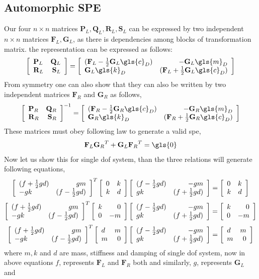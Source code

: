 \subsection{Automorphic SPE}
Our four $n\times n$ matrices $\mathbf{P}_L, \mathbf{Q}_L,\mathbf{R}_L,\mathbf{S}_L$ can be expressed by two independent $n\times n$ matrices 
$\mathbf{F}_L,\mathbf{G}_L$, as there is dependencies among blocks of 
transformation matrix. the representation can be expressed as follows:
\begin{align}
\mat{\mathbf{P}_L}{\mathbf{Q}_L}{\mathbf{R}_L}{\mathbf{S}_L} = \mat{(\mathbf{F}_L - \frac{1}{2}\mathbf{G}_L \gls{c}_D)}{-\mathbf{G}_L \gls{m}_D}{\mathbf{G}_L \gls{k}_D}{(\mathbf{F}_L + \frac{1}{2}\mathbf{G}_L \gls{c}_D)}
\end{align}
From symmetry one can also show that they can also be written by two 
independent matrices $\mathbf{F}_R$ and $\mathbf{G}_R$ as follows,
\begin{align}
{\mat{\mathbf{P}_R}{\mathbf{Q}_R}{\mathbf{R}_R}{\mathbf{S}_R}}^{-1} = \mat{(\mathbf{F}_R - \frac{1}{2}\mathbf{G}_R \gls{c}_D)}{-\mathbf{G}_R \gls{m}_D}{\mathbf{G}_R \gls{k}_D}{(\mathbf{F}_R + \frac{1}{2}\mathbf{G}_R \gls{c}_D)}
\end{align}
These matrices must obey following law to generate a valid \gls{spe},
\begin{align}\mathbf{F}_L {\mathbf{G}_R}^{T} + \mathbf{G}_L {\mathbf{F}_R}^T = \gls{0}\end{align}
Now let us show this for single \gls{dof} system, than the three relations will generate following equations,
\begin{align}{\left[ \begin{array}{lr} (f + \frac{1}{2}gd)& gm\\ -gk& (f - \frac{1}{2}gd)\end{array}\right]}^T\left[ \begin{array}{lr} 0& k\\ k& d\end{array}\right]\left[ \begin{array}{lr} (f - \frac{1}{2}gd)& -gm\\ gk& (f + \frac{1}{2}gd)\end{array}\right] =\left[ \begin{array}{lr} {0}& k\\ k& d\end{array}\right]\end{align}
\begin{align}{\left[ \begin{array}{lr} (f + \frac{1}{2}gd)& gm\\ -gk& (f - \frac{1}{2}gd)\end{array}\right]}^T\left[ \begin{array}{lr} k& {0}\\ {0}& -m\end{array}\right]\left[ \begin{array}{lr} (f - \frac{1}{2}gd)& -gm\\ gk& (f + \frac{1}{2}gd)\end{array}\right] =\left[ \begin{array}{lr} k& 0\\ {0}& -m\end{array}\right]\end{align}
\begin{align}{\left[ \begin{array}{lr} (f + \frac{1}{2}gd)& gm\\ -gk& (f - \frac{1}{2}gd)\end{array}\right]}^T\left[ \begin{array}{lr} d& m\\ m& {0}\end{array}\right]\left[ \begin{array}{lr} (f - \frac{1}{2}gd)& -gm\\ gk& (f + \frac{1}{2}gd)\end{array}\right] =\left[ \begin{array}{lr} d& m\\ m& 0\end{array}\right]\end{align}
where $m, k$ and $d$ are mass, stiffness and damping of single \gls{dof} 
system, now in above equations $f$, represents $\mathbf{F}_L$ and 
$\mathbf{F}_R$ both and similarly, $g$, represents $\mathbf{G}_L$ and 
